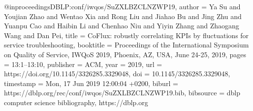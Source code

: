 @inproceedings{DBLP:conf/iwqos/SuZXLBZCLNZWP19,
  author    = {Ya Su and
               Youjian Zhao and
               Wentao Xia and
               Rong Liu and
               Jiahao Bu and
               Jing Zhu and
               Yuanpu Cao and
               Haibin Li and
               Chenhao Niu and
               Yiyin Zhang and
               Zhaogang Wang and
               Dan Pei},
  title     = {CoFlux: robustly correlating KPIs by fluctuations for service troubleshooting},
  booktitle = {Proceedings of the International Symposium on Quality of Service,
               IWQoS 2019, Phoenix, AZ, USA, June 24-25, 2019},
  pages     = {13:1--13:10},
  publisher = {{ACM}},
  year      = {2019},
  url       = {https://doi.org/10.1145/3326285.3329048},
  doi       = {10.1145/3326285.3329048},
  timestamp = {Mon, 17 Jun 2019 12:00:04 +0200},
  biburl    = {https://dblp.org/rec/conf/iwqos/SuZXLBZCLNZWP19.bib},
  bibsource = {dblp computer science bibliography, https://dblp.org}
}